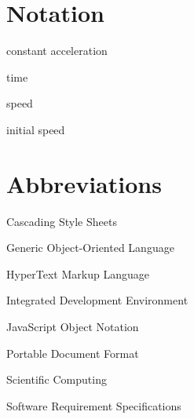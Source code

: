 
\section*{Notation}
\begin{description}[font=\rmfamily\bfseries, leftmargin=3cm, style=nextline]
	\item[$a^c$] constant acceleration
	\item[$t$] time
	\item[$v$] speed
	\item[$v^i$] initial speed
\end{description}

\section*{Abbreviations}
\begin{description}[font=\rmfamily\bfseries, leftmargin=3cm, style=nextline]
	\item[CSS] Cascading Style Sheets
	\item[GOOL] Generic Object-Oriented Language
	\item[HTML] HyperText Markup Language
	\item[IDE] Integrated Development Environment 
	\item[JSON] JavaScript Object Notation
	\item[PDF] Portable Document Format
	\item[SC] Scientific Computing
	\item[SRS] Software Requirement Specifications
\end{description}